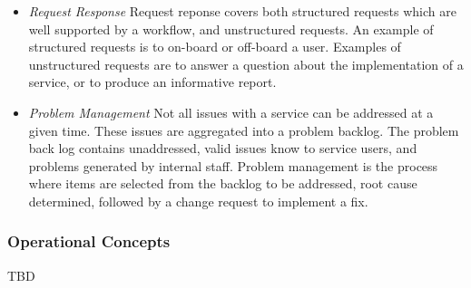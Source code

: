 \begin{enumerate}
\begin{itemize}
  \item \emph{Request Response} Request reponse covers both structured
  requests which are well supported by a workflow, and unstructured
  requests.  An example of structured requests is to on-board or
  off-board a user. Examples of unstructured requests are to answer a
  question about the implementation of a service, or to produce an
  informative report.

  \item \emph{Problem Management} Not all issues with a service can be
  addressed at a given time. These issues are aggregated into a problem
  backlog. The problem back log contains unaddressed, valid issues
  know to service users, and problems generated by internal staff.
  Problem management is the process where items are selected from the
  backlog to be addressed, root cause determined, followed by a change
  request to implement a fix.

  \end{itemize}

\end{enumerate}
\subsubsection{Operational Concepts}
TBD 


